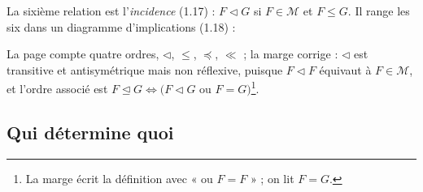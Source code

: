 \documentclass[11pt,a4paper]{article}
\begin{document}
La sixième relation est l'\emph{incidence} (1.17) : $F \mathrel{\triangleleft}
G$ si $F \in \mathcal{M}$ et $F \leq G$. Il range les six dans un diagramme
d'implications (1.18) :


La page compte quatre ordres, $\triangleleft$, $\leq$, $\preccurlyeq$, $\ll$ ; la
marge corrige : $\triangleleft$ est transitive et antisymétrique mais non
réflexive, puisque $F \mathrel{\triangleleft} F$ équivaut à $F \in \mathcal{M}$,
et l'ordre associé est $F \trianglelefteq G \iff (F \mathrel{\triangleleft} G$ ou
$F = G)$\footnote{La marge écrit la définition avec « ou $F = F$ » ; on lit
$F = G$.}.

\subsection*{Qui détermine quoi}
\end{document}
